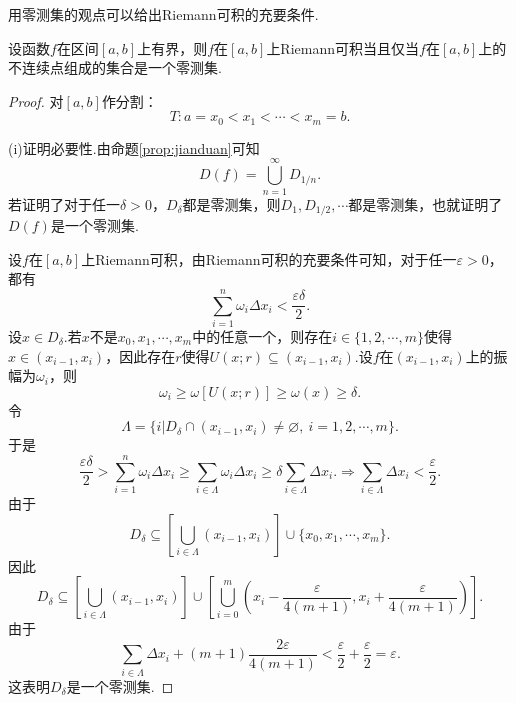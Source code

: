 用零测集的观点可以给出Riemann可积的充要条件.
\begin{theorem}
	设函数$f$在区间$\left[a,b\right]$上有界，则$f$在$\left[a,b\right]$上Riemann可积当且仅当$f$在$\left[a,b\right]$上的不连续点组成的集合是一个零测集.
\end{theorem}
\begin{proof}
	对$\left[a,b\right]$作分割：
	$$T:a=x_0<x_1<\cdots<x_m=b.$$
	
	(i)证明必要性.由命题\ref{prop:jianduan}可知
	$$D(f)=\bigcup_{n=1}^{\infty}D_{1/n}.$$
	若证明了对于任一$\delta>0$，$D_\delta$都是零测集，则$D_1,D_{1/2},\cdots$都是零测集，也就证明了$D(f)$是一个零测集.
	
	设$f$在$\left[a,b\right]$上Riemann可积，由Riemann可积的充要条件可知，对于任一$\varepsilon>0$，都有
	$$\sum_{i=1}^{n}\omega_i\Delta x_i<\frac{\varepsilon\delta}{2}.$$
	设$x\in D_\delta$.若$x$不是$x_0,x_1,\cdots,x_m$中的任意一个，则存在$i\in\{1,2,\cdots,m\}$使得$x\in (x_{i-1},x_i)$，因此存在$r$使得$U(x;r)\subseteq(x_{i-1},x_i)$.设$f$在$(x_{i-1},x_i)$上的振幅为$\omega_i$，则
	$$\omega_i\geqslant\omega\left[U(x;r)\right]\geqslant\omega(x)\geqslant \delta.$$
	令
	$$\Lambda=\{i|D_\delta\cap(x_{i-1},x_i)\neq\varnothing,\ i=1,2,\cdots,m\}.$$
	于是
	$$\frac{\varepsilon\delta}{2}>\sum_{i=1}^{n}\omega_i\Delta x_i\geqslant\sum_{i\in\Lambda}\omega_i\Delta x_i\geqslant\delta\sum_{i\in\Lambda}\Delta x_i.\Rightarrow\sum_{i\in\Lambda}\Delta x_i<\frac{\varepsilon}{2}.$$
	由于
	$$D_\delta\subseteq\left[\bigcup_{i\in\Lambda}(x_{i-1},x_i)\right]\cup\{x_0,x_1,\cdots,x_m\}.$$
	因此
	$$D_\delta\subseteq\left[\bigcup_{i\in\Lambda}(x_{i-1},x_i)\right]\cup\left[\bigcup_{i=0}^m(x_i-\frac{\varepsilon}{4(m+1)},x_i+\frac{\varepsilon}{4(m+1)})\right].$$
	由于
	$$\sum_{i\in\Lambda}\Delta x_i+(m+1)\frac{2\varepsilon}{4(m+1)}<\frac{\varepsilon}{2}+\frac{\varepsilon}{2}=\varepsilon.$$
	这表明$D_\delta$是一个零测集.
	

\end{proof}
